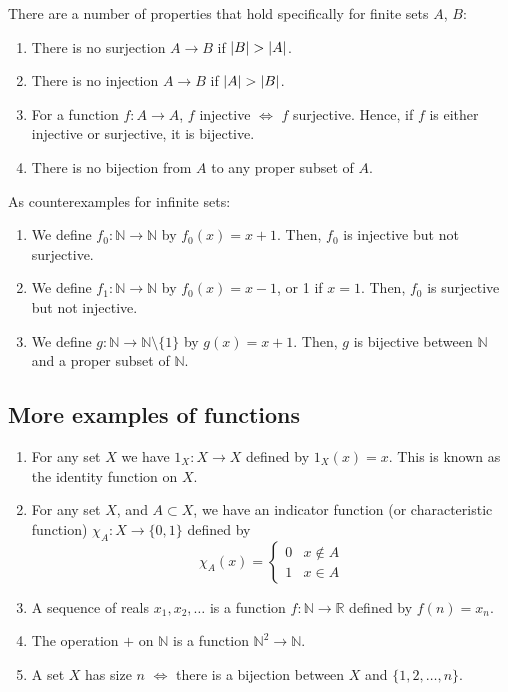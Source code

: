 There are a number of properties that hold specifically for finite sets \(A\), \(B\):
\begin{enumerate}
	\item There is no surjection \(A \to B\) if \(\abs{B} > \abs{A}\).
	\item There is no injection \(A \to B\) if \(\abs{A} > \abs{B}\).
	\item For a function \(f\colon A \to A\), \(f\) injective \(\iff\) \(f\) surjective.
	      Hence, if \(f\) is either injective or surjective, it is bijective.
	\item There is no bijection from \(A\) to any proper subset of \(A\).
\end{enumerate}
As counterexamples for infinite sets:
\begin{enumerate}
	\item We define \(f_0\colon \mathbb N \to \mathbb N\) by \(f_0(x) = x+1\).
	      Then, \(f_0\) is injective but not surjective.
	\item We define \(f_1\colon \mathbb N \to \mathbb N\) by \(f_0(x) = x-1\), or 1 if \(x=1\).
	      Then, \(f_0\) is surjective but not injective.
	\item We define \(g\colon \mathbb N \to \mathbb N \setminus \{ 1 \}\) by \(g(x) = x+1\).
	      Then, \(g\) is bijective between \(\mathbb N\) and a proper subset of \(\mathbb N\).
\end{enumerate}

\subsection{More examples of functions}
\begin{enumerate}
	\item For any set \(X\) we have \(1_X\colon X \to X\) defined by \(1_X(x) = x\).
	      This is known as the identity function on \(X\).
	\item For any set \(X\), and \(A \subset X\), we have an indicator function (or characteristic function) \(\chi_A\colon X \to \{ 0, 1 \}\) defined by
	      \[
		      \chi_A(x) = \begin{cases}
			      0 & x \notin A \\
			      1 & x \in A
		      \end{cases}
	      \]
	\item A sequence of reals \(x_1, x_2, \dots\) is a function \(f\colon \mathbb N \to \mathbb R\) defined by \(f(n) = x_n\).
	\item The operation \(+\) on \(\mathbb N\) is a function \(\mathbb N^2 \to \mathbb N\).
	\item A set \(X\) has size \(n\) \(\iff\) there is a bijection between \(X\) and \(\{ 1, 2, \dots, n \}\).
\end{enumerate}

